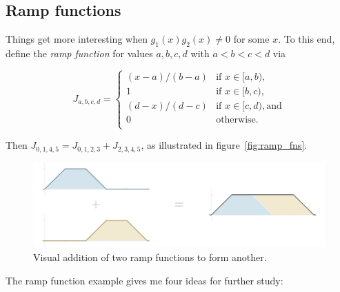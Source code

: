 \documentclass[]{article}
\begin{document}
\subsection{Ramp functions}\label{sec:rampux5ffunctions}

Things get more interesting when \(g_1(x) g_2(x) \ne 0\) for some \(x\).
To this end, define the \emph{ramp function} for values \(a,b,c,d\) with
\(a < b < c < d\) via

\[ J_{a,b,c,d} = \begin{cases}
(x - a) / (b - a) & \text{if } x \in [a, b), \\
1 & \text{if } x \in [b, c), \\
(d - x) / (d - c) & \text{if } x \in [c, d), \text{and} \\
0 & \text{otherwise.} \\
\end{cases}\]

Then \(J_{0,1,4,5} = J_{0,1,2,3} + J_{2,3,4,5}\), as illustrated in
figure~\ref{fig:ramp_fns}.

\begin{figure}[htbp]
\centering
\includegraphics{images/pdfs/ramp_fns3.pdf}
\caption{\label{fig:ramp_fns}Visual addition of two ramp functions to
form another.}\label{fig:rampux5ffns}
\end{figure}

The ramp function example gives me four ideas for further study:
\end{document}

